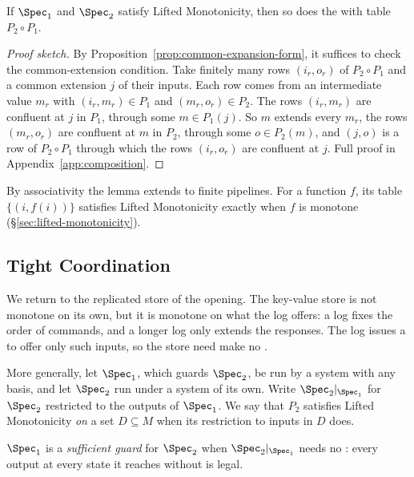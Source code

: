 \begin{lemma}[Composition]
\label{lem:composition}
If $\Spec_1$ and $\Spec_2$ satisfy Lifted Monotonicity, then so does the \spectype with table $P_2\circ P_1$.
\end{lemma}

\begin{proof}[Proof sketch]
By Proposition~\ref{prop:common-expansion-form}, it suffices to check the
common-extension condition.  Take finitely many rows $(i_r,o_r)$ of $P_2\circ P_1$ and a common extension $j$ of their inputs.  Each row comes from an intermediate value $m_r$ with $(i_r,m_r)\in P_1$ and $(m_r,o_r)\in P_2$.  The rows $(i_r,m_r)$ are confluent at $j$ in $P_1$, through some $m\in P_1(j)$.  So $m$ extends every $m_r$, the rows $(m_r,o_r)$ are confluent at $m$ in $P_2$, through some $o\in P_2(m)$, and $(j,o)$ is a row of $P_2\circ P_1$ through which the rows $(i_r,o_r)$ are confluent at $j$.  Full proof
in Appendix~\ref{app:composition}.
\end{proof}

By associativity the lemma extends to finite pipelines.  For a function $f$,
its table $\{(i,f(i))\}$ satisfies Lifted Monotonicity exactly when $f$ is
monotone (\S\ref{sec:lifted-monotonicity}).

\subsection{Tight Coordination}
\label{sec:tight-coordination}

We return to the replicated store of the opening.  The key-value store is not
monotone on its own, but it is monotone on what the log offers: a log fixes
the order of commands, and a longer log only extends the responses.  The log
issues a \commitment to offer only such inputs, so the store need make no
\commitments.

More generally, let $\Spec_1$, which guards $\Spec_2$, be run by a system with any basis, and
let $\Spec_2$ run under a system of its own.  Write $\Spec_2|_{\Spec_1}$ for $\Spec_2$ restricted to the outputs of
$\Spec_1$.  We say that $P_2$ satisfies Lifted Monotonicity \emph{on} a set
$D\subseteq M$ when its restriction to inputs in $D$ does.

\begin{definition}
\label{def:sufficient-guard}
$\Spec_1$ is a \emph{sufficient guard} for $\Spec_2$ when
$\Spec_2|_{\Spec_1}$ needs no \commitment: every output at every state it
reaches without \commitment is legal.
\end{definition}

